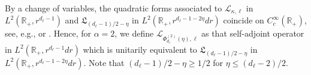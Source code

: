 \documentclass[12pt,reqno]{amsart}
\theoremstyle{definition}
\theoremstyle{remark}
\numberwithin{equation}{section}
\newcommand{\1}{\mathbbm{1}}
\newcommand{\R}{\mathbb{R}}
\def\cl{\mathcal{L}}
\def\fl{\mathfrak{L}}
\begin{document}
By a change of variables, the quadratic forms associated to $\cl_{\kappa,\ell}$ in $L^2(\R_+,r^{d_\ell-1})$ and $\fl_{(d_\ell-1)/2-\eta}$ in $L^2(\R_+,r^{d_\ell-1-2\eta}dr)$ coincide on $C_c^\infty(\R_+)$, see, e.g., \cite{Metafuneetal2018} or \cite{BogdanMerz2024}. Hence, for $\alpha=2$, we define $\cl_{\Phi_{d_\ell}^{(2)}(\eta),\ell}$ as that self-adjoint operator in $L^2(\R_+,r^{d_\ell-1}dr)$ which is unitarily equivalent to $\fl_{(d_\ell-1)/2-\eta}$ in $L^2(\R_+,r^{d_\ell-1-2\eta}dr)$. Note that $(d_\ell-1)/2-\eta\geq1/2$ for $\eta\leq(d_\ell-2)/2$.

\end{document}
